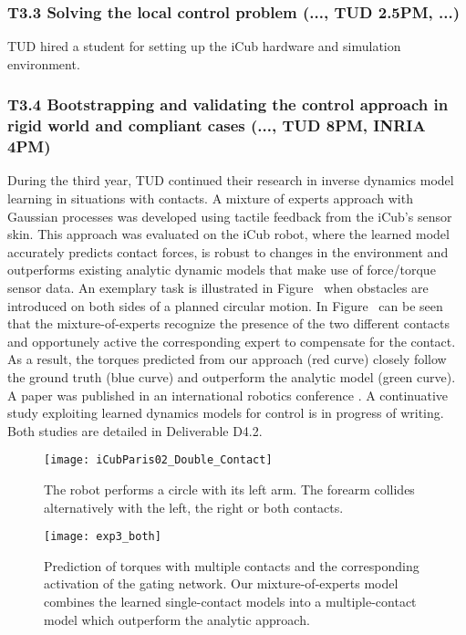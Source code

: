 \subsubsection*{T3.3 Solving the local control problem (..., TUD 2.5PM, ...)}

TUD hired a student for setting up the iCub hardware and simulation environment.
    

\subsubsection*{T3.4 Bootstrapping and validating the control approach in rigid world and compliant cases (..., TUD 8PM, INRIA 4PM)} 
    
During the third year, TUD continued their research in inverse dynamics model
learning in situations with contacts. A mixture of experts approach with
Gaussian processes was developed using tactile feedback from the iCub's sensor
skin. This approach was evaluated on the iCub robot, where the learned model
accurately predicts contact forces, is robust to changes in the environment and
outperforms existing analytic dynamic models that make use of force/torque
sensor data. 
An exemplary task is illustrated in Figure~\cite{fig:exp3:icuparis_experiment_bars} 
when obstacles are introduced on both sides of a planned circular motion.
In Figure~\cite{fig:exp3:gating} can be seen that the mixture-of-experts recognize the presence of the two different contacts and opportunely active the corresponding expert to compensate for the contact.
As a result, the torques predicted from our approach (red curve) closely follow the ground truth (blue curve) and outperform the analytic model (green curve).
A paper was published in an international robotics conference
\cite{Calandra_ICRA15}. A continuative study exploiting learned dynamics models
for control is in progress of writing. Both studies are detailed in Deliverable
D4.2.

	\begin{figure}[t]
		\begin{minipage}{.43\linewidth}
			\centering
			\texttt{[image: iCubParis02\_Double\_Contact]}
			\caption{The robot performs a circle with its left arm. 
			The forearm collides alternatively with the left, the right or both contacts.}
			\label{fig:exp3:icuparis_experiment_bars}
		\end{minipage}	
		\hfill
		\begin{minipage}{.52\linewidth}
			\centering
			\texttt{[image: exp3\_both]}
			\caption{Prediction of torques with multiple contacts and the corresponding activation of the gating network.
			Our mixture-of-experts model combines the learned single-contact models into a multiple-contact model which outperform the analytic approach.
			}
			\label{fig:exp3:gating}
		\end{minipage}	
	\end{figure}
	
